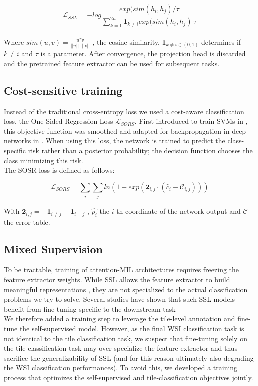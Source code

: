 \begin{equation}
\mathcal{L}_{SSL} = -log \frac{exp(sim(h_i, h_j) / \tau}{\sum^{2n}_{k=1} \mathbf{1}_{k \neq i} exp(sim(h_i, h_j) \ \tau } 
\end{equation}
\\

Where $sim( u, v ) = \frac{u^{T} v}{|| u ||\cdot|| v ||}$ , the cosine similarity, $\mathbf{1}_{k \neq i \in (0, 1) }$  determines if $k \neq i$ and $\tau$ is a parameter. After convergence, the projection head is discarded and the pretrained feature extractor can be used for subsequent tasks.

\subsection{Cost-sensitive training}
Instead of the traditional cross-entropy loss we used a cost-aware classification loss, the One-Sided Regression Loss $\mathcal{L}_{SORS}$. First introduced to train SVMs in \citep{tu_one-sided_2010}, this objective function was smoothed and adapted for backpropagation in deep networks in \citep{chung_cost-aware_2016}. When using this loss, the network is trained to predict the class-specific risk   rather than a posterior probability; the decision function chooses the class minimizing this risk.  \\
The SOSR loss is defined as follows:

\begin{equation}
\mathcal{L}_{SORS} = \sum_i \sum_j ln(1 + exp(\mathbf{2}_{i,j} \cdot (\hat{c}_i - \mathcal{C}_{i,j})))
\end{equation}

With $\mathbf{2}_{i,j} = - \mathbf{1}_{i \neq j}  + \mathbf{1}_{i = j}$ , $\hat{p_i}$ the $i$-th coordinate of the network output and $\mathcal{C}$ the error table.

\subsection{Mixed Supervision}
To be tractable, training of attention-MIL architectures requires freezing the feature extractor weights. While SSL allows the feature extractor to build meaningful representations \citep{saillard_identification_2021, dehaene_self-supervision_2020}, they are not specialized to the actual classification problems we try to solve. Several studies have shown that such SSL models benefit from fine-tuning specific to the downstream task \citep{chen_simple_2020} \\
We therefore added a training step to leverage the tile-level annotation and fine-tune the self-supervised model.
However, as the final WSI classification task is not identical to the tile classification task, we suspect that fine-tuning solely on the tile classification task may over-specialize the feature extractor and thus sacrifice the generalizability of SSL (and for this reason ultimately also degrading the WSI classification performances).
To avoid this, we developed a training process that optimizes the self-supervised and tile-classification objectives jointly.

